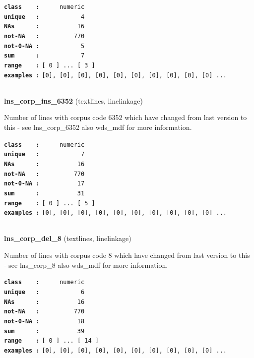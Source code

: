 \documentclass[]{article}
\begin{document}
\textbf{\texttt{class\ \ \ \ :}} \texttt{~~~~~numeric}\\
\textbf{\texttt{unique\ \ \ :}} \texttt{~~~~~~~~~~~4}\\
\textbf{\texttt{NAs\ \ \ \ \ \ :}} \texttt{~~~~~~~~~~16}\\
\textbf{\texttt{not-NA\ \ \ :}} \texttt{~~~~~~~~~770}\\
\textbf{\texttt{not-0-NA\ :}} \texttt{~~~~~~~~~~~5}\\
\textbf{\texttt{sum\ \ \ \ \ \ :}} \texttt{~~~~~~~~~~~7}\\
\textbf{\texttt{range\ \ \ \ :}}
\texttt{{[}\ 0\ {]}\ ...\ {[}\ 3\ {]}}\\
\textbf{\texttt{examples\ :}}
\texttt{{[}0{]},\ {[}0{]},\ {[}0{]},\ {[}0{]},\ {[}0{]},\ {[}0{]},\ {[}0{]},\ {[}0{]},\ {[}0{]},\ {[}0{]}\ ...}\\

~

\textbf{lns\_corp\_ins\_6352} (textlines, linelinkage)

Number of lines with corpus code 6352 which have changed from last
version to this - see lns\_corp\_6352 also wds\_mdf for more
information.

\textbf{\texttt{class\ \ \ \ :}} \texttt{~~~~~numeric}\\
\textbf{\texttt{unique\ \ \ :}} \texttt{~~~~~~~~~~~7}\\
\textbf{\texttt{NAs\ \ \ \ \ \ :}} \texttt{~~~~~~~~~~16}\\
\textbf{\texttt{not-NA\ \ \ :}} \texttt{~~~~~~~~~770}\\
\textbf{\texttt{not-0-NA\ :}} \texttt{~~~~~~~~~~17}\\
\textbf{\texttt{sum\ \ \ \ \ \ :}} \texttt{~~~~~~~~~~31}\\
\textbf{\texttt{range\ \ \ \ :}}
\texttt{{[}\ 0\ {]}\ ...\ {[}\ 5\ {]}}\\
\textbf{\texttt{examples\ :}}
\texttt{{[}0{]},\ {[}0{]},\ {[}0{]},\ {[}0{]},\ {[}0{]},\ {[}0{]},\ {[}0{]},\ {[}0{]},\ {[}0{]},\ {[}0{]}\ ...}\\

~

\textbf{lns\_corp\_del\_8} (textlines, linelinkage)

Number of lines with corpus code 8 which have changed from last version
to this - see lns\_corp\_8 also wds\_mdf for more information.

\textbf{\texttt{class\ \ \ \ :}} \texttt{~~~~~numeric}\\
\textbf{\texttt{unique\ \ \ :}} \texttt{~~~~~~~~~~~6}\\
\textbf{\texttt{NAs\ \ \ \ \ \ :}} \texttt{~~~~~~~~~~16}\\
\textbf{\texttt{not-NA\ \ \ :}} \texttt{~~~~~~~~~770}\\
\textbf{\texttt{not-0-NA\ :}} \texttt{~~~~~~~~~~18}\\
\textbf{\texttt{sum\ \ \ \ \ \ :}} \texttt{~~~~~~~~~~39}\\
\textbf{\texttt{range\ \ \ \ :}}
\texttt{{[}\ 0\ {]}\ ...\ {[}\ 14\ {]}}\\
\textbf{\texttt{examples\ :}}
\texttt{{[}0{]},\ {[}0{]},\ {[}0{]},\ {[}0{]},\ {[}0{]},\ {[}0{]},\ {[}0{]},\ {[}0{]},\ {[}0{]},\ {[}0{]}\ ...}\\
\end{document}
